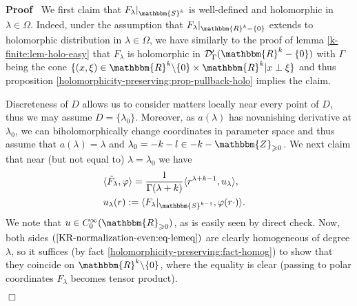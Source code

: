 \documentclass{article}
\newcommand{\assign}{:=}
\newenvironment{proof}{\noindent\textbf{Proof\ }}{\hspace*{\fill}$\Box$\medskip}
\numberwithin{definition}{section}
\numberwithin{lemma}{section}
\numberwithin{proposition}{section}
{\theorembodyfont{\rmfamily}\newtheorem{remark}{Remark}
\numberwithin{remark}{section}
}
\begin{document}
\begin{proof}
  We first claim that $F_{\lambda} |_{\mathbbm{S}^k}$ is well-defined and
  holomorphic in $\lambda \in \Omega$. Indeed, under the assumption that
  $F_{\lambda} |_{\mathbbm{R}^k - \{ 0 \}}$ extends to holomorphic
  distribution in $\lambda \in \Omega$, we have similarly to the proof of
  lemma \ref{k-finite:lem-holo-easy} that $F_{\lambda}$ is holomorphic in
  $\mathcal{D}'_{\Gamma} ( \mathbbm{R}^k - \{ 0 \})$ with $\Gamma$ being the
  cone $\{ ( x, \xi) \in \mathbbm{R}^k \backslash \{ 0 \} \times \mathbbm{R}^k
  | x \perp \xi \}$ and thus proposition
  \ref{holomorphicity-preserving:prop-pullback-holo} implies the claim.
  
  Discreteness of $D$ allows us to consider matters locally near every point
  of $D$, thus we may assume $D = \{ \lambda_0 \}$. Moreover, as $a (
  \lambda)$ has novanishing derivative at $\lambda_0$, we can
  biholomorphically change coordinates in parameter space and thus assume that
  $a ( \lambda) = \lambda$ and $\lambda_0 = - k - l \in - k
  -\mathbbm{Z}_{\geqslant 0}$. We next claim that near (but not equal to)
  $\lambda = \lambda_0$ we have
  \begin{eqnarray}
    & \langle \tilde{F}_{\lambda}, \varphi \rangle = \frac{1}{\Gamma (
    \lambda + k)} \langle r^{\lambda + k - 1}, u_{\lambda} \rangle, 
    \label{KR-normalization-even:eq-lemeq} & \\
    & u_{\lambda} ( r) \assign \langle F_{\lambda} |_{\mathbbm{S}^{k - 1}},
    \varphi ( r \cdot) \rangle . &  \nonumber
  \end{eqnarray}
  We note that $u \in C^{\infty}_0 ( \mathbbm{R}_{\geqslant 0})$, as is easily
  seen by direct check. Now, both sides $(
  \ref{KR-normalization-even:eq-lemeq})$ are clearly homogeneous of degree
  $\lambda$, so it suffices (by fact
  \ref{holomorphicity-preserving:fact-homog}) to show that they coincide on
  $\mathbbm{R}^k \backslash \{ 0 \}$, where the equality is clear (passing to
  polar coordinates $F_{\lambda}$ becomes tensor product).
  

\end{proof}
\end{document}
